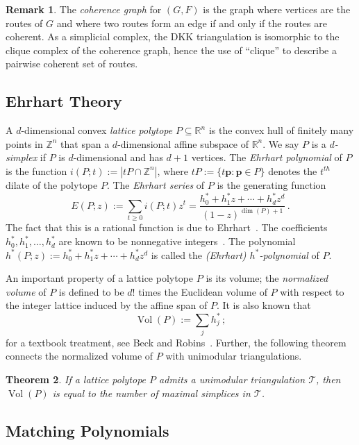 \documentclass[12pt]{amsart}
\newtheorem{theorem}{Theorem}[section]
\theoremstyle{definition}
\newtheorem{remark}[theorem]{Remark}
\newcommand\bp{\mathbf{p}}
\newcommand\Z{\mathbb{Z}}
\newcommand\R{\mathbb{R}}
\newcommand\calT{\mathcal{T}}
\DeclareMathOperator{\vol}{Vol}
\begin{document}
\begin{remark}
    The \emph{coherence graph} for $(G,F)$ is the graph where vertices are the routes of $G$ and where two routes form an edge if and only if the routes are coherent. 
    As a simplicial complex, the DKK triangulation is isomorphic to the clique complex of the coherence graph, hence the use of ``clique'' to describe a pairwise coherent set of routes. 
\end{remark}


\subsection{Ehrhart Theory}\label{sec:ehrhart}

A $d$-dimensional convex \emph{lattice polytope} $P\subseteq\R^n$ is the convex hull of finitely many points in $\Z^n$ that span a $d$-dimensional affine subspace of $\R^n$.
We say $P$ is a \emph{$d$-simplex} if $P$ is $d$-dimensional and has $d+1$ vertices.
The \emph{Ehrhart polynomial} of $P$ is the function $i(P;t):=|tP\cap\Z^n|$, where $tP:=\{t\bp:\bp\in P\}$ denotes the $t^{th}$ dilate of the polytope $P$.
The \emph{Ehrhart series} of $P$ is the generating function
\[
  E(P;z) := \sum_{t\geq0}i(P;t)z^t = \frac{h_0^*+h_1^*z+\cdots+h_d^*z^d}{(1-z)^{\dim(P)+1}} \, .
\]
The fact that this is a rational function is due to Ehrhart~\cite{ehrhart}.
The coefficients $h^\ast_0,h^\ast_1,\ldots,h^\ast_d$ are known to be nonnegative integers~\cite{StanleyDecompositions}.
The polynomial $h^\ast(P;z):=h_0^*+h_1^*z+\cdots+h_d^*z^d$ is called the \emph{(Ehrhart) $h^\ast$-polynomial} of $P$.

An important property of a lattice polytope $P$ is its volume; the \emph{normalized volume} of $P$ is defined to be $d!$ times the Euclidean volume of $P$ with respect to the integer lattice induced by the affine span of $P$.
It is also known that
\[
\vol(P):=\sum_jh^*_j \, ;
\]
for a textbook treatment, see Beck and Robins~\cite{BeckRobinsCCD}.
Further, the following theorem connects the normalized volume of $P$ with unimodular triangulations.

\begin{theorem}\label{thm:volumeunimodular}
    If a lattice polytope $P$ admits a unimodular triangulation $\calT$, then $\vol(P)$ is equal to the number of maximal simplices in $\calT$.
\end{theorem}

\subsection{Matching Polynomials}
\end{document}
